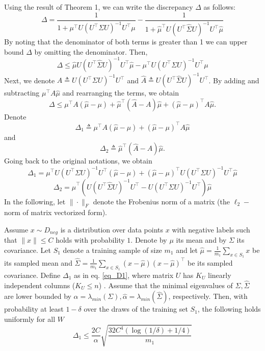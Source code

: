 \documentclass[twoside,11pt]{article}
\begin{document}
Using the result of Theorem 1, we can write the discrepancy $\Delta$ as follows:
\small
$$\Delta=\frac{1}{1+\mu^\top U(U^\top\Sigma U)^{-1}U^\top\mu}-\frac{1}{1+\hat{\mu}^\top U(U^\top\hat{\Sigma} U)^{-1}U^\top\hat{\mu}}$$
By noting that the denominator of both terms is greater than 1 we can upper bound $\Delta$ by omitting the denominator. Then,
$$\Delta\leq \hat{\mu}U(U^\top\hat{\Sigma}U)^{-1}U^\top\hat{\mu}-\mu^\top U(U^\top \Sigma U)^{-1}U^\top\mu $$
Next, we denote $A\triangleq U(U^\top\Sigma U)^{-1}U^\top$ and $\hat{A}\triangleq U(U^\top\hat{\Sigma } U)^{-1}U^\top$. By adding and subtracting $\mu^\top A\hat{\mu}$ and rearranging the terms, we obtain
\begin{equation}
\label{eq:Delta}
\Delta\leq\mu^\top A(\hat{\mu}-\mu)+\hat{\mu}^\top(\hat{A}-A)\hat{\mu}+(\hat{\mu}-\mu)^\top A\hat{\mu}.
\end{equation}
Denote
$$\Delta_1 \triangleq \mu^\top A(\hat{\mu}-\mu)+(\hat{\mu}-\mu)^ \top A\hat{\mu}$$ and
$$\Delta_2\triangleq \hat{\mu}^\top(\hat{A}-A)\hat{\mu}.$$ Going back to the original notations, we obtain
\begin{equation}\label{eq_D1}
\Delta_1=\mu^\top U(U^\top\Sigma U)^{-1}U^\top(\hat{\mu}-\mu)+(\hat{\mu}-\mu)^\top U(U^\top\Sigma U)^{-1}U^\top\hat{\mu}
\end{equation}
\begin{equation}\label{eq_D2}
\Delta_2=\hat{\mu}^\top(U(U^\top\hat{\Sigma } U)^{-1}U^\top-U(U^\top\Sigma U)^{-1}U^\top)\hat{\mu}
\end{equation}
In the following, let $\|\cdot\|_F$  denote the Frobenius norm of a matrix (the $\ell_2-$ norm of matrix vectorized form).
\begin{lemma}
\label{lemma:d1}
Assume $x \sim D_{neg}$ is a distribution over data points $x$ with negative labels such that $\|x\| \le C$ holds with probability $1$. Denote by $\mu$ its mean and by $\Sigma$ its covariance. Let $S_1$ denote a training sample of size $m_1$ and let $\hat \mu = \frac{1}{m_1} \sum_{x \in S_1} x$ be its sampled mean and $\hat \Sigma = \frac{1}{m_1} \sum_{x \in S_1} (x-\hat \mu) (x - \hat \mu)^\top$ be its sampled covariance. Define $\Delta_1$ as in eq. \ref{eq_D1}, where matrix $U$ has $K_U$ linearly independent columns ($K_U\leq n$) .
Assume that the minimal eigenvalues of $\Sigma, \hat \Sigma$ are lower bounded by $ \alpha  = \lambda_{min} (\Sigma), \hat \alpha  = \lambda_{min} (\hat \Sigma)$, respectively. Then, with probability at least $1-\delta$ over the draws of the training set $S_1$, the following holds uniformly for all $W$
$$\Delta_1 \le \frac{2C}{\alpha}\sqrt{\frac{32C^4 (\log (1/\delta) + 1/4)}{m_1}}$$
\end{lemma}
\end{document}
